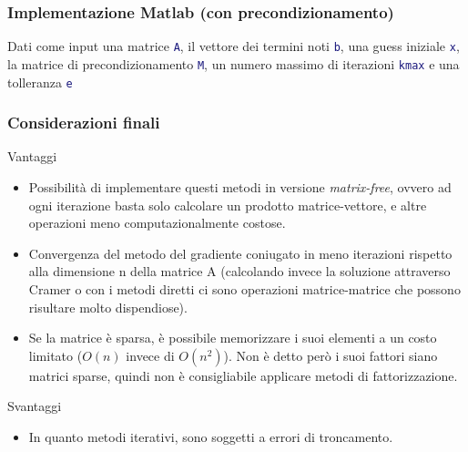 \documentclass[10pt]{beamer}
\begin{document}
\begin{frame}\frametitle{Implementazione Matlab (con precondizionamento)}
Dati come input
una matrice \lstinline[language=Matlab]{A}, 
il vettore dei termini noti \lstinline[language=Matlab]{b},
una guess iniziale \lstinline[language=Matlab]{x},
la matrice di precondizionamento \lstinline[language=Matlab]{M},
un numero massimo di iterazioni \lstinline[language=Matlab]{kmax}
e una tolleranza \lstinline[language=Matlab]{e}

\end{frame}

\begin{frame}
\frametitle{Considerazioni finali}
    Vantaggi
    \begin{itemize}
        \item Possibilità di implementare questi metodi in versione \textit{matrix-free}, ovvero ad ogni iterazione basta solo calcolare un prodotto matrice-vettore, e altre operazioni meno computazionalmente costose. %
        \item Convergenza del metodo del gradiente coniugato in meno iterazioni rispetto alla dimensione n della matrice A (calcolando invece la soluzione attraverso Cramer o con i metodi diretti ci sono operazioni matrice-matrice che possono risultare molto dispendiose).
        \item Se la matrice è \alert{sparsa}, è possibile memorizzare i suoi elementi a un costo limitato ($O(n)$ invece di $O(n^2)$). Non è detto però i suoi fattori siano matrici sparse, quindi non è consigliabile applicare metodi di fattorizzazione.
        \end{itemize}
    Svantaggi
    \begin{itemize}
        \item In quanto metodi iterativi, sono soggetti a errori di troncamento. %
    \end{itemize}
\end{frame}
\end{document}
